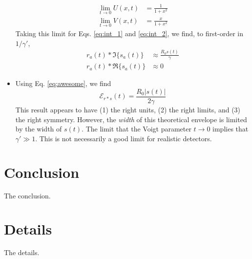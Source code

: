 \documentclass[amsmath,amssymb,aps,prd,10pt,twocolumn,showkeys]{revtex4}
\begin{document}
\begin{itemize}
\begin{align}
\lim_{t\to 0} U(x,t) &= \frac{1}{1+x^2} \\
\lim_{t\to 0} V(x,t) &= \frac{x}{1+x^2}
\end{align}
Taking this limit for Eqs. \ref{eq:int_1} and \ref{eq:int_2}, we find, to first-order in $1/\gamma'$, 
\begin{align}
r_a(t) * \Im\lbrace s_a(t)\rbrace &\approx \frac{R_0s(t)}{\gamma} \\
r_a(t) * \Re\lbrace s_a(t)\rbrace &\approx 0
\end{align}
\item 
Using Eq. \ref{eq:awesome}, we find
\begin{equation}
\boxed{\mathcal{E}_{r * s}(t) = \frac{R_0|s(t)|}{2\gamma}}
\end{equation}
This result appears to have (1) the right units, (2) the right limits, and (3) the right symmetry.  However, the \textit{width} of this theoretical envelope is limited by the width of $s(t)$.  The limit that the Voigt parameter $t \to 0$ implies that $\gamma' \gg 1$.  This is not necessarily a good limit for realistic detectors.
\end{itemize}

\section{Conclusion}
\label{sec:conc}

The conclusion.

\appendix

\section{Details}
\label{app:a}

The details.


\end{document}
